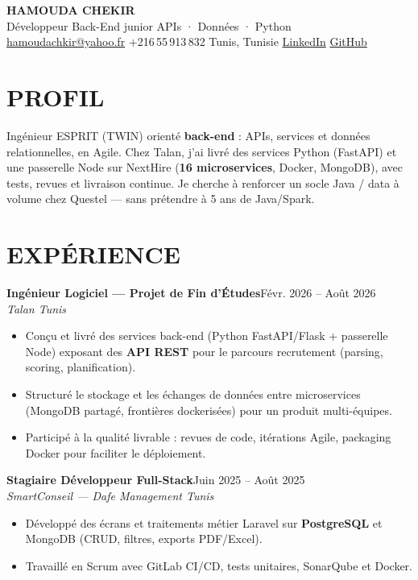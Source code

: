 \documentclass[10pt,a4paper]{article}
\newcommand{\TargetTitle}{Développeur Back-End junior \textbar{} APIs · Données · Python}
\newcommand{\job}[3]{%
  \textbf{\color{primary}#1}\hfill{\color{muted}\small #2}\\[-1pt]
  {\color{accent}\textit{#3}}\\[1pt]
  \begin{itemize}
}
\newcommand{\contactsep}{\hspace{4pt}{\color{rulecolor}|}\hspace{4pt}}
\begin{document}
{\fontsize{20}{24}\selectfont\bfseries\color{primary}HAMOUDA CHEKIR}\\[1pt]
{\normalsize\color{accent}\TargetTitle}\\[3pt]
{\footnotesize\color{muted}%
  \hspace{2pt}\href{mailto:hamoudachkir@yahoo.fr}{hamoudachkir@yahoo.fr}%
  \contactsep
  \hspace{2pt}+216\,55\,913\,832%
  \contactsep
  \hspace{2pt}Tunis, Tunisie%
  \contactsep
  \hspace{2pt}\href{https://www.linkedin.com/in/hamouda-chekir-5053572b4}{LinkedIn}%
  \contactsep
  \hspace{2pt}\href{https://github.com/hamoudachekir}{GitHub}%
}\\[4pt]

\section{PROFIL}
Ingénieur ESPRIT (TWIN) orienté \textbf{back-end} : APIs, services et données relationnelles, en Agile.
Chez Talan, j'ai livré des services Python (FastAPI) et une passerelle Node sur NextHire (\textbf{16 microservices}, Docker, MongoDB), avec tests, revues et livraison continue.
Je cherche à renforcer un socle Java / data à volume chez Questel — sans prétendre à 5 ans de Java/Spark.

\section{EXPÉRIENCE}

\job{Ingénieur Logiciel — Projet de Fin d'Études}{Févr. 2026 -- Août 2026}{Talan \textbar{} Tunis}
  \item Conçu et livré des services back-end (Python FastAPI/Flask + passerelle Node) exposant des \textbf{API REST} pour le parcours recrutement (parsing, scoring, planification).
  \item Structuré le stockage et les échanges de données entre microservices (MongoDB partagé, frontières dockerisées) pour un produit multi-équipes.
  \item Participé à la qualité livrable : revues de code, itérations Agile, packaging Docker pour faciliter le déploiement.
\end{itemize}

\job{Stagiaire Développeur Full-Stack}{Juin 2025 -- Août 2025}{SmartConseil — Dafe Management \textbar{} Tunis}
  \item Développé des écrans et traitements métier Laravel sur \textbf{PostgreSQL} et MongoDB (CRUD, filtres, exports PDF/Excel).
  \item Travaillé en Scrum avec GitLab CI/CD, tests unitaires, SonarQube et Docker.
\end{itemize}
\end{document}
